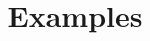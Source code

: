 \documentclass[11pt]{kasper}
\begin{document}
\begin{sectionunit}
\begin{sectionunit}
\end{sectionunit}
\end{sectionunit}

\begin{sectionunit}
\title{Examples}
\maketitle

\end{sectionunit}
\end{document}
